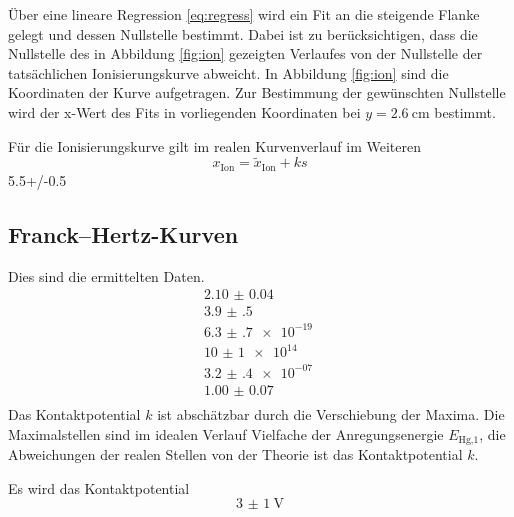 Über eine lineare Regression \eqref{eq:regress} wird ein Fit an die steigende Flanke gelegt und dessen Nullstelle bestimmt.
Dabei ist zu berücksichtigen, dass die Nullstelle des in Abbildung \ref{fig:ion} gezeigten Verlaufes von der Nullstelle der tatsächlichen Ionisierungskurve abweicht.
In Abbildung \ref{fig:ion} sind die Koordinaten der Kurve aufgetragen.
Zur Bestimmung der gewünschten Nullstelle wird der x-Wert des Fits in vorliegenden Koordinaten bei $y=\SI{2.6}{\centi\meter}$ bestimmt.

Für die Ionisierungskurve gilt im realen Kurvenverlauf im Weiteren
\begin{equation}
	x_\text{Ion}=\tilde{x}_\text{Ion}+ks
\end{equation}
5.5+/-0.5




\subsection{Franck--Hertz-Kurven} %
\label{sec:fhk}

Dies sind die ermittelten Daten.
\begin{align}
	\SI{2.10(4)}{}\\
	\SI{3.9(5)}{}\\
	\SI{6.3(7)e-19}{}\\
	\SI{10(1)e+14}{}\\
	\SI{3.2(4)e-07}{}\\
	\SI{1.00(7)}{}\\
\end{align}
Das Kontaktpotential $k$ ist abschätzbar durch die Verschiebung der Maxima.
Die Maximalstellen sind im idealen Verlauf Vielfache der Anregungsenergie $E_\text{Hg,1}$, 
die Abweichungen der realen Stellen von der Theorie ist das Kontaktpotential $k$.

Es wird das Kontaktpotential
\begin{equation}
	\SI{3(1)}{\volt}
\end{equation}
